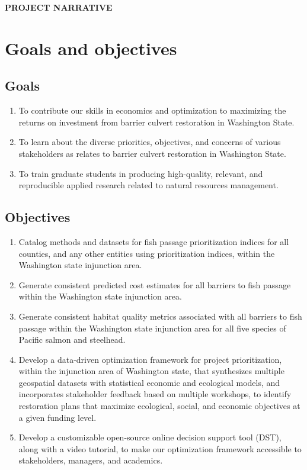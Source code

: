 \documentclass[12pt]{elsarticle}
\begin{document}
\begin{center} \textbf{PROJECT NARRATIVE} \end{center}

%
\section{Goals and objectives} 
\subsection*{Goals}
\begin{enumerate}
\item To contribute our skills in economics and optimization to maximizing the returns on investment from barrier culvert restoration in Washington State.
\item To learn about the diverse priorities, objectives, and concerns of various stakeholders as relates to barrier culvert restoration in Washington State.
\item To train graduate students in producing high-quality, relevant, and reproducible applied research related to natural resources management.
\end{enumerate}

\subsection*{Objectives}
\begin{enumerate}
\item Catalog methods and datasets for fish passage prioritization indices for all counties, and any other entities using prioritization indices, within the Washington state injunction area. 
\item Generate consistent predicted cost estimates for all barriers to fish passage within the Washington state injunction area. 
\item Generate consistent habitat quality metrics associated with all barriers to fish passage within the Washington state injunction area for all five species of Pacific salmon and steelhead. 
\item Develop a data-driven optimization framework for project prioritization, within the injunction area of Washington state, that synthesizes multiple geospatial datasets with statistical economic and ecological models, and incorporates stakeholder feedback based on multiple workshops, to identify restoration plans that maximize ecological, social, and economic objectives at a given funding level.
\item Develop a customizable open-source online decision support tool (DST), along with a video tutorial, to make our optimization framework accessible to stakeholders, managers, and academics. 
\end{enumerate}
\end{document}
